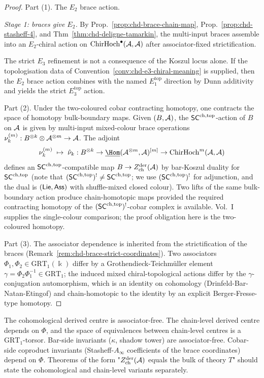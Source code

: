 \begin{proof}
Part (1). The $E_2$ brace action.

\emph{Stage 1: braces give $E_2$.} By Prop.~\ref{prop:chd-brace-chain-map},
Prop.~\ref{prop:chd-stasheff-4}, and Thm~\ref{thm:chd-deligne-tamarkin},
the multi-input braces assemble into an $E_2$-chiral action on
$\mathrm{ChirHoch}^\bullet(\mathcal{A}, \mathcal{A})$ after associator-fixed strictification.

The strict $E_3$ refinement is not a consequence of the Koszul locus
alone. If the topologisation data of
Convention~\ref{conv:chd-e3-chiral-meaning} is supplied, then the
$E_2$ brace action combines with the named $E_1^{\mathrm{top}}$
direction by Dunn additivity and yields the strict
$E_3^{\mathrm{top}}$ action.

Part (2). Under the two-coloured cobar contracting homotopy, one
contracts the space of homotopy
bulk-boundary maps. Given $(B, \mathcal{A})$, the $\mathsf{SC}^{\mathrm{ch},\mathrm{top}}$-action of $B$ on
$\mathcal{A}$ is given by multi-input mixed-colour brace operations
$\nu_k^{(m)}: B^{\otimes k}\otimes \mathcal{A}^{\otimes m}\to \mathcal{A}$. The adjoint
\[
 \nu_k^{(m)} \;\mapsto\; \hat{\nu}_k:
 B^{\otimes k} \to \underline{\Hom}(\cA^{\otimes m}, \cA)^{[m]} \to
 \ChirHoch^m(\cA, \cA)
\]
defines an $\mathsf{SC}^{\mathrm{ch},\mathrm{top}}$-compatible map $B \to Z^{\mathrm{der}}_{\mathrm{ch}}(\mathcal{A})$ by
bar-Koszul duality for $\mathsf{SC}^{\mathrm{ch},\mathrm{top}}$ (note that
$(\mathsf{SC}^{\mathrm{ch},\mathrm{top}})^! \ne \mathsf{SC}^{\mathrm{ch},\mathrm{top}}$; we use $(\mathsf{SC}^{\mathrm{ch},\mathrm{top}})^!$ for adjunction,
and the dual is $(\mathsf{Lie}, \mathsf{Ass})$ with shuffle-mixed closed colour). Two
lifts of the same bulk-boundary action produce chain-homotopic maps
provided the required contracting homotopy of the
$(\mathsf{SC}^{\mathrm{ch},\mathrm{top}})^!$-cobar complex is available. Vol.~I supplies the
single-colour comparison; the proof obligation here is the
two-coloured homotopy.

Part (3). The associator dependence is inherited from the
strictification of the braces (Remark~\ref{rem:chd-brace-strict-coordinates}).
Two associators $\Phi_1, \Phi_2 \in \mathrm{GRT}_1(\Bbbk)$ differ
by a Grothendieck-Teichm\"uller element
$\gamma = \Phi_2 \Phi_1^{-1}\in \mathrm{GRT}_1$; the induced
mixed chiral-topological actions differ by the $\gamma$-conjugation
automorphism, which is an identity on cohomology
(Drinfeld-Bar-Natan-Etingof) and chain-homotopic to the identity by
an explicit Berger-Fresse-type homotopy.
\end{proof}

\begin{remark}%
\label{rem:chd-associator-discipline}%
%
The cohomological derived centre is associator-free. The chain-level
derived centre depends on $\Phi$,
and the space of equivalences between chain-level centres is a
$\mathrm{GRT}_1$-torsor. Bar-side invariants ($\kappa$, shadow tower)
are associator-free. Cobar-side coproduct invariants
(Stasheff-$A_\infty$ coefficients of the brace coordinates) depend
on $\Phi$. Theorems of the form "$Z^{\mathrm{der}}_{\mathrm{ch}}(\mathcal{A})$
equals the bulk of theory $T$" should state the cohomological and
chain-level variants separately.
\end{remark}

